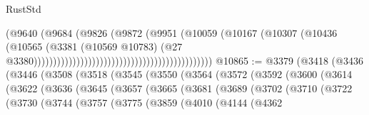 \begin{lexlean}{RustStd}
\begin{coremodule}
                                                                        (@9640
                                                                          (@9684
                                                                            (@9826
                                                                              (@9872
                                                                                (@9951
                                                                                  (@10059
                                                                                    (@10167
                                                                                      (@10307
                                                                                        (@10436
                                                                                          (@10565
                                                                                            (@3381
                                                                                              (@10569
                                                                                                @10783)
                                                                                              (@27
                                                                                                @3380))))))))))))))))))))))))))))))))))))))))))))))
@10865 := @3379
    (@3418
      (@3436
        (@3446
          (@3508
            (@3518
              (@3545
                (@3550
                  (@3564
                    (@3572
                      (@3592
                        (@3600
                          (@3614
                            (@3622
                              (@3636
                                (@3645
                                  (@3657
                                    (@3665
                                      (@3681
                                        (@3689
                                          (@3702
                                            (@3710
                                              (@3722
                                                (@3730
                                                  (@3744
                                                    (@3757
                                                      (@3775
                                                        (@3859
                                                          (@4010
                                                            (@4144
                                                              (@4362

\end{coremodule}
\end{lexlean}
